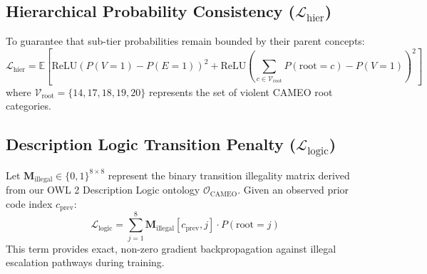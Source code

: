 \documentclass[11pt,a4paper]{article}
\begin{document}
\subsection{\texorpdfstring{Hierarchical Probability Consistency ($\mathcal{L}_{\text{hier}}$)}{Hierarchical Probability Consistency}}
To guarantee that sub-tier probabilities remain bounded by their parent concepts:
\begin{equation}
    \mathcal{L}_{\text{hier}} = \mathbb{E}\left[ \text{ReLU}(P(V=1) - P(E=1))^2 + \text{ReLU}\left(\sum_{c \in \mathcal{V}_{\text{root}}} P(\text{root}=c) - P(V=1)\right)^2 \right]
\end{equation}
where $\mathcal{V}_{\text{root}} = \{14, 17, 18, 19, 20\}$ represents the set of violent CAMEO root categories.

\subsection{\texorpdfstring{Description Logic Transition Penalty ($\mathcal{L}_{\text{logic}}$)}{Description Logic Transition Penalty}}
Let $\mathbf{M}_{\text{illegal}} \in \{0, 1\}^{8 \times 8}$ represent the binary transition illegality matrix derived from our OWL 2 Description Logic ontology $\mathcal{O}_{\text{CAMEO}}$. Given an observed prior code index $c_{\text{prev}}$:
\begin{equation}
    \mathcal{L}_{\text{logic}} = \sum_{j=1}^8 \mathbf{M}_{\text{illegal}}[c_{\text{prev}}, j] \cdot P(\text{root} = j)
\end{equation}
This term provides exact, non-zero gradient backpropagation against illegal escalation pathways during training.
\end{document}
